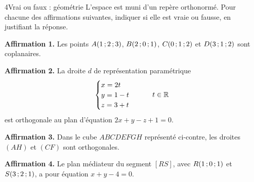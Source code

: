 \begin{exoBac}{4}{Vrai ou faux : géométrie}
L'espace est muni d'un repère orthonormé. Pour chacune des affirmations suivantes, indiquer si elle est vraie ou fausse, en justifiant
la réponse.
\begin{questions}
  \item \textbf{Affirmation 1.} Les points $A(1\,{;}\,2\,{;}\,3)$, $B(2\,{;}\,0\,{;}\,1)$, $C(0\,{;}\,1\,{;}\,2)$ et $D(3\,{;}\,1\,{;}\,2)$ sont coplanaires.
  \item \textbf{Affirmation 2.} La droite $d$ de représentation paramétrique
    \[\begin{cases}x=2t\\y=1-t\\z=3+t\end{cases}\qquad t\in\mathbb{R}\]
    est orthogonale au plan d'équation $2x+y-z+1=0$.
\end{questions}
\begin{codecote}[0.68]
\begin{questions}[start=3]
  \item \textbf{Affirmation 3.} Dans le cube $ABCDEFGH$ représenté ci-contre, les droites $(AH)$ et $(CF)$ sont orthogonales.
  \item \textbf{Affirmation 4.} Le plan médiateur du segment $[RS]$, avec $R(1\,{;}\,0\,{;}\,1)$ et $S(3\,{;}\,2\,{;}\,1)$, a pour équation
    $x+y-4=0$.
\end{questions}
\cote
\centering
{}
\end{codecote}
\end{exoBac}

